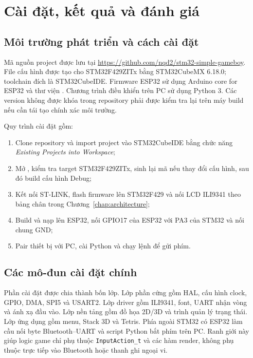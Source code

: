 \chapter{Cài đặt, kết quả và đánh giá}
\label{chap:deployment}

\section{Môi trường phát triển và cách cài đặt}

Mã nguồn project được lưu tại \url{https://github.com/nqd2/stm32-simple-gameboy}. File cấu hình  được tạo cho STM32F429ZITx bằng STM32CubeMX 6.18.0; toolchain đích là STM32CubeIDE. Firmware ESP32 sử dụng Arduino core for ESP32 và thư viện . Chương trình điều khiển trên PC sử dụng Python 3. Các version không được khóa trong repository phải được kiểm tra lại trên máy build nếu cần tái tạo chính xác môi trường.

Quy trình cài đặt gồm:
\begin{enumerate}
  \item Clone repository và import project  vào STM32CubeIDE bằng chức năng \textit{Existing Projects into Workspace};
  \item Mở , kiểm tra target STM32F429ZITx, sinh lại mã nếu thay đổi cấu hình, sau đó build cấu hình Debug;
  \item Kết nối ST-LINK, flash firmware lên STM32F429 và nối LCD ILI9341 theo bảng chân trong Chương~\ref{chap:architecture};
  \item Build và nạp  lên ESP32, nối GPIO17 của ESP32 với PA3 của STM32 và nối chung GND;
  \item Pair thiết bị  với PC, cài Python và chạy lệnh  để gửi phím.
\end{enumerate}

\section{Các mô-đun cài đặt chính}

Phần cài đặt được chia thành bốn lớp. Lớp phần cứng gồm HAL, cấu hình clock, GPIO, DMA, SPI5 và USART2. Lớp driver gồm ILI9341, font, UART nhận vòng và ánh xạ đầu vào. Lớp nền tảng gồm đồ họa 2D/3D và trình quản lý trạng thái. Lớp ứng dụng gồm menu, Stack 3D và Tetris. Phía ngoài STM32 có ESP32 làm cầu nối byte Bluetooth--UART và script Python bắt phím trên PC. Ranh giới này giúp logic game chỉ phụ thuộc \texttt{InputAction\_t} và các hàm render, không phụ thuộc trực tiếp vào Bluetooth hoặc thanh ghi ngoại vi.

